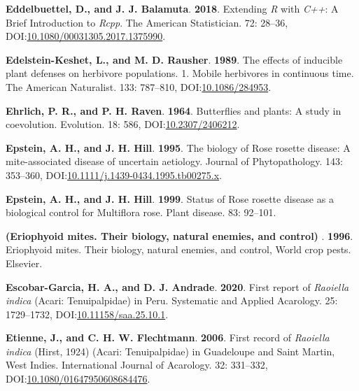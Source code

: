 \documentclass[12pt,final,CPage]{ufthesis}
\newlength{\cslhangindent}
\newenvironment{CSLReferences}[2] %
{%
	\setlength{\parindent}{0pt}
	\ifodd #1 \everypar{\setlength{\hangindent}{\cslhangindent}}\ignorespaces\fi
	\ifnum #2 > 0
	\setlength{\parskip}{#2\baselineskip}
	\fi
}%
{}
\begin{document}
{\begin{CSLReferences}{1}{0}
  \leavevmode{}%
  \textbf{Eddelbuettel, D., and J. J. Balamuta}. \textbf{2018}. {Extending \emph{R} with \emph{C++}: A Brief Introduction to \emph{Rcpp}}. The American Statistician. 72: 28--36, DOI:\href{https://doi.org/10.1080/00031305.2017.1375990}{10.1080/00031305.2017.1375990}.

  \leavevmode{}%
  \textbf{Edelstein-Keshet, L., and M. D. Rausher}. \textbf{1989}. The effects of inducible plant defenses on herbivore populations. 1. Mobile herbivores in continuous time. The American Naturalist. 133: 787--810, DOI:\href{https://doi.org/10.1086/284953}{10.1086/284953}.

  \leavevmode{}%
  \textbf{Ehrlich, P. R., and P. H. Raven}. \textbf{1964}. Butterflies and plants: A study in coevolution. Evolution. 18: 586, DOI:\href{https://doi.org/10.2307/2406212}{10.2307/2406212}.

  \leavevmode{}%
  \textbf{Epstein, A. H., and J. H. Hill}. \textbf{1995}. The biology of {Rose rosette disease}: A mite-associated disease of uncertain aetiology. Journal of Phytopathology. 143: 353--360, DOI:\href{https://doi.org/10.1111/j.1439-0434.1995.tb00275.x}{10.1111/j.1439-0434.1995.tb00275.x}.

  \leavevmode{}%
  \textbf{Epstein, A. H., and J. H. Hill}. \textbf{1999}. Status of {Rose rosette disease} as a biological control for {Multiflora rose}. Plant disease. 83: 92--101.

  \leavevmode{}%
  \textbf{(Eriophyoid mites. Their biology, natural enemies, and control) }. \textbf{1996}. Eriophyoid mites. Their biology, natural enemies, and control, World crop pests. Elsevier.

  \leavevmode{}%
  \textbf{Escobar-Garcia, H. A., and D. J. Andrade}. \textbf{2020}. First report of {\emph{Raoiella indica}} ({Acari}: {Tenuipalpidae}) in {Peru}. Systematic and Applied Acarology. 25: 1729--1732, DOI:\href{https://doi.org/10.11158/saa.25.10.1}{10.11158/saa.25.10.1}.

  \leavevmode{}%
  \textbf{Etienne, J., and C. H. W. Flechtmann}. \textbf{2006}. First record of {\emph{Raoiella indica}} ({Hirst}, 1924) ({Acari}: {Tenuipalpidae}) in {Guadeloupe} and {Saint Martin}, {West Indies}. International Journal of Acarology. 32: 331--332, DOI:\href{https://doi.org/10.1080/01647950608684476}{10.1080/01647950608684476}.


\end{CSLReferences}}
\end{document}
